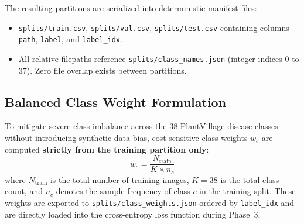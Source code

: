 The resulting partitions are serialized into deterministic manifest files:
\begin{itemize}
    \item \texttt{splits/train.csv}, \texttt{splits/val.csv}, \texttt{splits/test.csv} containing columns \texttt{path}, \texttt{label}, and \texttt{label\_idx}.
    \item All relative filepaths reference \texttt{splits/class\_names.json} (integer indices $0$ to $37$). Zero file overlap exists between partitions.
\end{itemize}

\subsection{Balanced Class Weight Formulation}
To mitigate severe class imbalance across the 38 PlantVillage disease classes without introducing synthetic data bias, cost-sensitive class weights $w_c$ are computed \textbf{strictly from the training partition only}:
\begin{equation}
    w_c = \frac{N_{\text{train}}}{K \times n_c}
\end{equation}
where $N_{\text{train}}$ is the total number of training images, $K = 38$ is the total class count, and $n_c$ denotes the sample frequency of class $c$ in the training split. These weights are exported to \texttt{splits/class\_weights.json} ordered by \texttt{label\_idx} and are directly loaded into the cross-entropy loss function during Phase~3.
